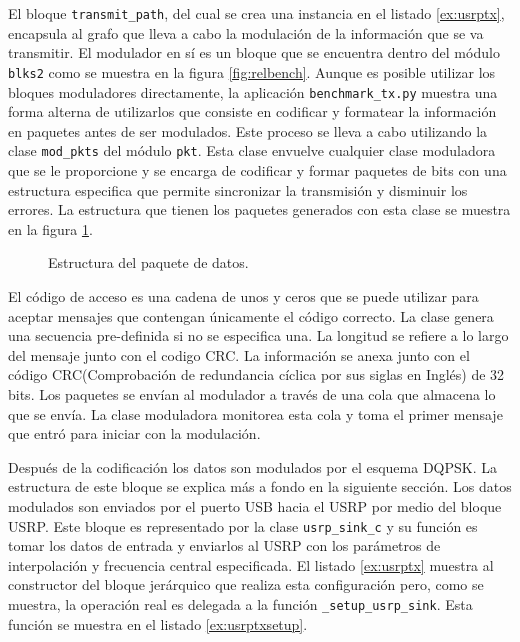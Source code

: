El bloque \verb|transmit_path|, del cual se crea una instancia en el listado \ref{ex:usrptx},
encapsula al grafo que lleva a cabo la modulaci\'on de la informaci\'on que se va transmitir. El
modulador en s\'i es un bloque que se encuentra dentro del m\'odulo \verb|blks2| como se muestra en la
figura \ref{fig:relbench}. Aunque es posible utilizar los bloques moduladores directamente, la
aplicaci\'on \verb|benchmark_tx.py| muestra una forma alterna de utilizarlos que consiste en
codificar y formatear la informaci\'on en paquetes antes de ser modulados. Este proceso se lleva a
cabo utilizando la clase \verb|mod_pkts| del m\'odulo \verb|pkt|. Esta clase envuelve cualquier
clase moduladora que se le proporcione y se encarga de codificar y formar paquetes de bits con una
estructura especifica que permite sincronizar la transmisi\'on y disminuir los errores. La
estructura que tienen los paquetes generados con esta clase se muestra en la figura \ref{fig:packet}.

\begin{figure}[tp]
  \centering
	\vspace{0.3in}
	\caption{Estructura del paquete de datos.}
	\label{fig:packet}
\end{figure}

El c\'odigo de acceso es una cadena de unos y ceros que se puede utilizar para aceptar mensajes que
contengan \'unicamente el c\'odigo correcto. La clase genera una secuencia pre-definida si no se
especifica una. La longitud se refiere a lo largo del mensaje junto con el codigo CRC. La informaci\'on se
anexa junto con el c\'odigo CRC(Comprobaci\'on de redundancia c\'iclica por sus siglas en Ingl\'es) de 32 bits. Los paquetes se
env\'ian al modulador a trav\'es de una cola que almacena lo que se env\'ia. La clase moduladora monitorea esta cola y toma el
primer mensaje que entr\'o para iniciar con la modulaci\'on.

Despu\'es de la codificaci\'on los datos son modulados por el esquema DQPSK. La estructura de este
bloque se explica m\'as a fondo en la siguiente secci\'on. Los datos modulados son enviados por el
puerto USB hacia el USRP por medio del bloque USRP. Este bloque es representado por la clase
\verb|usrp_sink_c| y su funci\'on es tomar los datos de entrada y enviarlos al USRP con los
par\'ametros de interpolaci\'on y frecuencia central especificada. El listado \ref{ex:usrptx}
muestra al constructor del bloque jer\'arquico que realiza esta configuraci\'on pero, como se muestra, la operaci\'on real es
delegada a la funci\'on \verb|_setup_usrp_sink|. Esta funci\'on se muestra en el listado \ref{ex:usrptxsetup}.

